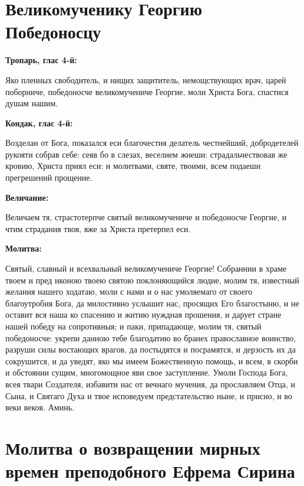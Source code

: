 \section{Великомученику Георгию Победоносцу}
 

\bfseries Тропарь, глас 4-й:\normalfont{}\nopagebreak


Яко пленных свободитель, и нищих защититель, немощствующих врач, царей поборниче, победоносче великомучениче Георгие, моли Христа Бога, спастися душам нашим.


\medskip


\bfseries Кондак, глас 4-й:\normalfont{}\nopagebreak


Возделан от Бога, показался еси благочестия делатель честнейший, добродетелей рукояти собрав себе: сеяв бо в слезах, веселием жнеши: страдальчествовав же кровию, Христа приял еси: и молитвами, святе, твоими, всем подаеши прегрешений прощение.


\medskip


\bfseries Величание:\normalfont{}\nopagebreak


Величаем тя, страстотерпче святый великомучениче и победоносче Георгие, и чтим страдания твоя, яже за Христа претерпел еси.


\medskip


\bfseries Молитва:\normalfont{}\nopagebreak


Святый, славный и всехвальный великомучениче Георгие! Собраннии в храме твоем и пред иконою твоею святою поклоняющийся людие, молим тя, известный желания нашего ходатаю, моли с нами и о нас умоляемаго от своего благоутробия Бога, да милостивно услышит нас, просящих Его благостыню, и не оставит вся наша ко спасению и житию нуждная прошения, и дарует стране нашей победу на сопротивныя; и паки, припадающе, молим тя, святый победоносче: укрепи данною тебе благодатию во бранех православное воинство, разруши силы востающих врагов, да постыдятся и посрамятся, и дерзость их да сокрушится, и да уведят, яко мы имеем Божественную помощь, и всем, в скорби и обстоянии сущим, многомощное яви свое заступление. Умоли Господа Бога, всея твари Создателя, избавити нас от вечнаго мучения, да прославляем Отца, и Сына, и Святаго Духа и твое исповедуем предстательство ныне, и присно, и во веки веков. Аминь.


\section{Молитва о возвращении мирных времен преподобного Ефрема Сирина}
 



